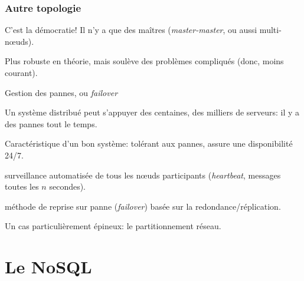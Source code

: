 \begin{frame}
\frametitle{Autre topologie}

C'est la démocratie! Il n'y a que des maîtres (\textit{master-master}, ou aussi multi-nœuds).

\vfill



\vfill

Plus robuste en théorie, mais soulève des problèmes compliqués (donc, moins courant).

\end{frame}


\begin{frame}{Gestion des pannes, ou \textit{failover}}

Un système distribué peut s'appuyer  des centaines, des milliers de serveurs: \alert{il y a des pannes
tout le temps}.

\vfill

Caractéristique d'un bon système: tolérant aux pannes, assure une disponibilité 24/7.

\begin{redbullet}
  \item surveillance automatisée de tous les nœuds participants (\textit{heartbeat}, messages toutes les $n$ secondes).
  \item \alert{méthode de reprise sur panne} (\textit{failover}) basée sur la redondance/réplication.
\end{redbullet}

\vfill

Un cas particulièrement épineux: le \alert{partitionnement réseau}.

\end{frame}

\section{Le NoSQL}


